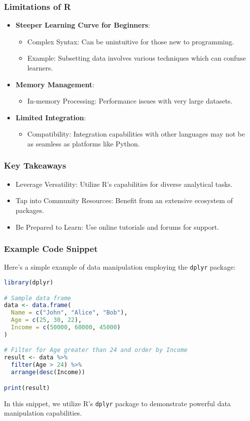 \documentclass[aspectratio=169]{beamer}
\begin{document}
\begin{frame}[fragile]
    \frametitle{Limitations of R}
    \begin{itemize}
        \item \textbf{Steeper Learning Curve for Beginners}:
        \begin{itemize}
            \item Complex Syntax: Can be unintuitive for those new to programming.
            \item Example: Subsetting data involves various techniques which can confuse learners.
        \end{itemize}
        
        \item \textbf{Memory Management}:
        \begin{itemize}
            \item In-memory Processing: Performance issues with very large datasets.
        \end{itemize}
        
        \item \textbf{Limited Integration}:
        \begin{itemize}
            \item Compatibility: Integration capabilities with other languages may not be as seamless as platforms like Python.
        \end{itemize}
    \end{itemize}
\end{frame}

\begin{frame}[fragile]
    \frametitle{Key Takeaways}
    \begin{itemize}
        \item Leverage Versatility: Utilize R's capabilities for diverse analytical tasks.
        \item Tap into Community Resources: Benefit from an extensive ecosystem of packages.
        \item Be Prepared to Learn: Use online tutorials and forums for support.
    \end{itemize}
\end{frame}

\begin{frame}[fragile]
    \frametitle{Example Code Snippet}
    Here’s a simple example of data manipulation employing the \texttt{dplyr} package:
    
    \begin{lstlisting}[language=R]
library(dplyr)

# Sample data frame
data <- data.frame(
  Name = c("John", "Alice", "Bob"),
  Age = c(25, 30, 22),
  Income = c(50000, 60000, 45000)
)

# Filter for Age greater than 24 and order by Income
result <- data %>%
  filter(Age > 24) %>%
  arrange(desc(Income))

print(result)
    \end{lstlisting}
    
    In this snippet, we utilize R's \texttt{dplyr} package to demonstrate powerful data manipulation capabilities.
\end{frame}
\end{document}
